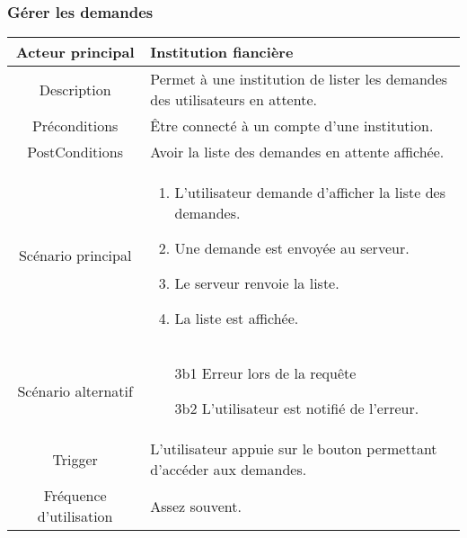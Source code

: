 \documentclass{article}
\begin{document}
\subsubsection{Gérer les demandes}
\begin{table}[h]
   \begin{tabular}{|c|p{10cm}|}
      \hline
      Acteur principal&Institution fiancière\\
      \hline
      Description&Permet à une institution de lister les demandes des utilisateurs en attente.\\
      \hline
      Préconditions&Être connecté à un compte d'une institution.\\
      \hline
      PostConditions&Avoir la liste des demandes en attente affichée.\\
      \hline
      Scénario principal& 
            \begin{enumerate}
               \item L'utilisateur demande d'afficher la liste des demandes.
               \item Une demande est envoyée au serveur.
               \item Le serveur renvoie la liste.
               \item La liste est affichée.
            \end{enumerate}     \\
      \hline
      Scénario alternatif&
            \begin{itemize}
               \item[3b1] Erreur lors de la requête
               \item[3b2] L'utilisateur est notifié de l'erreur.  
            \end{itemize}\\
      \hline
      Trigger&L'utilisateur appuie sur le bouton permettant d'accéder aux demandes.\\
      \hline
      Fréquence d'utilisation&Assez souvent.\\
      \hline
   \end{tabular}
\end{table}

\newpage
\end{document}
